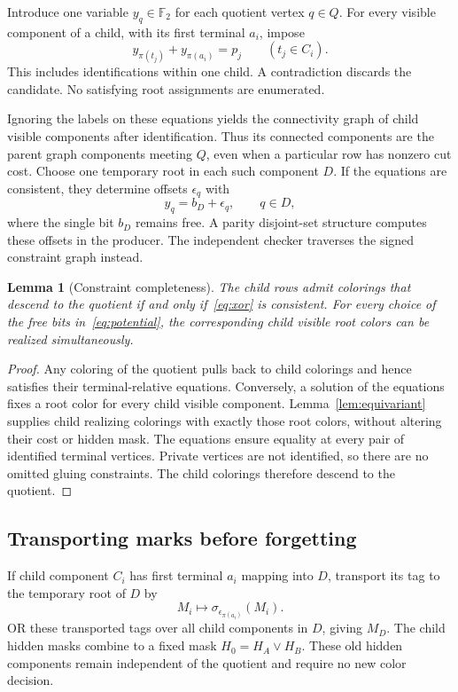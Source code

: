 \documentclass[11pt,letterpaper]{article}
\newtheorem{lemma}[theorem]{Lemma}
\theoremstyle{definition}
\theoremstyle{remark}\newtheorem{remark}[theorem]{Remark}
\newcommand{\F}{\mathbb F}
\newcommand{\sw}{\sigma}
\begin{document}
Introduce one variable $y_q\in\F_2$ for each quotient vertex $q\in Q$. For every visible component of a child, with its first terminal $a_i$, impose
\begin{equation}\label{eq:xor}
 y_{\pi(t_j)}+y_{\pi(a_i)}=p_j\qquad(t_j\in C_i).
\end{equation}
This includes identifications within one child. A contradiction discards the candidate. No satisfying root assignments are enumerated.

Ignoring the labels on these equations yields the connectivity graph of child visible components after identification. Thus its connected components are the parent graph components meeting $Q$, even when a particular row has nonzero cut cost. Choose one temporary root in each such component $D$. If the equations are consistent, they determine offsets $\epsilon_q$ with
\begin{equation}\label{eq:potential}
 y_q=b_D+\epsilon_q,\qquad q\in D,
\end{equation}
where the single bit $b_D$ remains free. A parity disjoint-set structure computes these offsets in the producer. The independent checker traverses the signed constraint graph instead.

\begin{lemma}[Constraint completeness]\label{lem:xor}
The child rows admit colorings that descend to the quotient if and only if~\eqref{eq:xor} is consistent. For every choice of the free bits in~\eqref{eq:potential}, the corresponding child visible root colors can be realized simultaneously.
\end{lemma}
\begin{proof}
Any coloring of the quotient pulls back to child colorings and hence satisfies their terminal-relative equations. Conversely, a solution of the equations fixes a root color for every child visible component. Lemma~\ref{lem:equivariant} supplies child realizing colorings with exactly those root colors, without altering their cost or hidden mask. The equations ensure equality at every pair of identified terminal vertices. Private vertices are not identified, so there are no omitted gluing constraints. The child colorings therefore descend to the quotient.
\end{proof}

\subsection{Transporting marks before forgetting}
If child component $C_i$ has first terminal $a_i$ mapping into $D$, transport its tag to the temporary root of $D$ by
\[
 M_i\longmapsto\sw_{\epsilon_{\pi(a_i)}}(M_i).
\]
OR these transported tags over all child components in $D$, giving $M_D$. The child hidden masks combine to a fixed mask $H_0=H_A\lor H_B$. These old hidden components remain independent of the quotient and require no new color decision.
\end{document}
